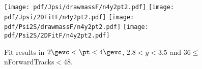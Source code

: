\begin{figure}[H]
\begin{center}
\texttt{[image: pdf/Jpsi/drawmassF/n4y2pt2.pdf]}
\texttt{[image: pdf/Jpsi/2DFitF/n4y2pt2.pdf]}
\vspace*{-0.5cm}
\texttt{[image: pdf/Psi2S/drawmassF/n4y2pt2.pdf]}
\texttt{[image: pdf/Psi2S/2DFitF/n4y2pt2.pdf]}
\vspace*{-0.5cm}
\end{center}
\caption{Fit results in $2\gevc<\pt<4\gevc$, $2.8<y<3.5$ and 36$\leq$nForwardTracks$<$48.}
\label{Fitn4y2pt2}
\end{figure}
